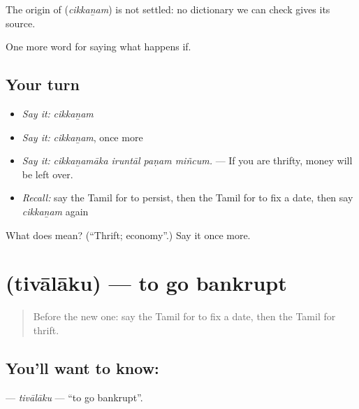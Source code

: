 \begin{cousinweb}
The origin of \textbf{} (\emph{cikkaṉam}) is not settled: no dictionary we can check gives its source.
\end{cousinweb}

\begin{grammarlens}[title={What you've built}]
One more word for saying what happens if.
\end{grammarlens}

\subsection*{Your turn}
\begin{itemize}
\raggedright
  \item \emph{Say it:} \emph{cikkaṉam}
  \item \emph{Say it:} \emph{cikkaṉam}, once more
  \item \emph{Say it:} \emph{cikkaṉamāka iruntāl paṇam miñcum.} — If you are thrifty, money will be left over.
  \item \emph{Recall:} say the Tamil for to persist, then the Tamil for to fix a date, then say \emph{cikkaṉam} again
\end{itemize}

\begin{tcolorbox}[breakable,colback=teal!4,colframe=teal!35!black,title={Before you move on}]
What does  mean? (\textquotedblleft{}Thrift; economy\textquotedblright{}.) Say it once more.
\end{tcolorbox}
\section[\texorpdfstring{\ta{திவாலாகு} (tivālāku)}{திவாலாகு (tivālāku)}]{ (tivālāku) — to go bankrupt}

\label{lesson:TA-C548-tivalaku}



\begin{quote}
Before the new one: say the Tamil for to fix a date, then the Tamil for thrift.
\end{quote}

\subsection*{You'll want to know: }
\textbf{} — \emph{tivālāku} — \textquotedblleft{}to go bankrupt\textquotedblright{}.

